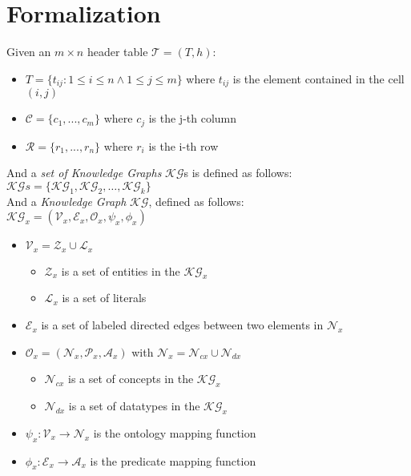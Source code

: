 \documentclass{llncs}
\begin{document}
\section{Formalization}
Given an $m\times n$ header table $\mathcal{T} =(T, h)$:
\begin{itemize}
      \item $T = \{t_{ij}: 1\leq i \leq n \land  1\leq j \leq m\}$ where $t_{ij}$ is the element contained in the cell $(i, j)$
      \item $\mathcal{C} = \{c_1,...,c_m\}$ where $c_j$ is the j-th column
      \item $\mathcal{R} = \{r_1,...,r_n\}$ where $r_i$ is the i-th row
\end{itemize}
And a \textit{set of Knowledge Graphs} $\mathcal{KG}$s is defined as follows:\\
$\mathcal{KG}s = \{\mathcal{KG}_1,\mathcal{KG}_2,\ldots,\mathcal{KG}_k\}$\\
And a \textit{Knowledge Graph} $\mathcal{KG}$, defined as follows:\\
$\mathcal{KG}_x=(\mathcal{V}_x, \mathcal{E}_x, \mathcal{O}_x, \psi_x, \phi_x)$
\begin{itemize}
      \item $\mathcal{V}_x =\mathcal{Z}_x\cup\mathcal{L}_x $
            \begin{itemize}
                  \item $\mathcal{Z}_x$ is a set of entities in the $\mathcal{KG}_x$
                  \item $\mathcal{L}_x$ is a set of literals
            \end{itemize}
      \item $\mathcal{E}_x$ is a set of labeled directed edges between two elements in $\mathcal{N}_x$
      \item $\mathcal{O}_x =(\mathcal{N}_x,\mathcal{P}_x, \mathcal{A}_x)$ with $\mathcal{N}_x = \mathcal{N}_{cx} \cup \mathcal{N}_{dx}$
            \begin{itemize}
                  \item $\mathcal{N}_{cx}$ is a set of concepts in the $\mathcal{KG}_x$
                  \item $\mathcal{N}_{dx}$ is a set of datatypes in the $\mathcal{KG}_x$
            \end{itemize}
      \item $\psi_x: \mathcal{V}_x\to \mathcal{N}_x$ is the ontology mapping function
      \item $\phi_x: \mathcal{E}_x\to\mathcal{A}_x$ is the predicate mapping function
\end{itemize}
\end{document}
